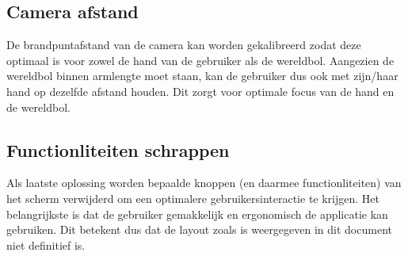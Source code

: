 \subsection{Camera afstand} \label{subsec:cameraafstand}
De brandpuntafstand van de camera kan worden gekalibreerd zodat deze optimaal is voor zowel de hand van de gebruiker als de wereldbol. Aangezien de wereldbol binnen armlengte moet staan, kan de gebruiker dus ook met zijn/haar hand op dezelfde afstand houden. Dit zorgt voor optimale focus van de hand en de wereldbol.
\subsection{Functionliteiten schrappen} \label{subsec:scrap}
Als laatste oplossing worden bepaalde knoppen (en daarmee functionliteiten) van het scherm verwijderd om een optimalere gebruikersinteractie te krijgen. Het belangrijkste is dat de gebruiker gemakkelijk en ergonomisch de applicatie kan gebruiken. Dit betekent dus dat de layout zoals is weergegeven in dit document niet definitief is.